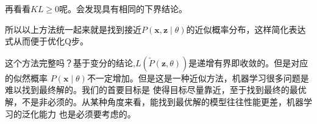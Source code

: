 \documentclass{article}
\begin{document}
        再看看$KL\ge0$呢。会发现具有相同的下界结论。

        所以以上方法统一起来就是找到接近$P(\boldsymbol{x},\boldsymbol{z}\mid\theta)$的近似概率分布，这样简化表达式从而便于优化Q步。

        这个方法完整吗？基于变分的结论,$L(\widetilde{P}(\boldsymbol{z},\theta))$是递增有界即收敛的。但是对应的似然概率
        $P(\boldsymbol{x}\mid\theta)$不一定增加。但是这是一种近似方法，机器学习很多问题是难以找到最终解的。我们的首要目标是
        使得目标尽量靠近，至于找到最终的最优解，不是非必须的。从某种角度来看，能找到最优解的模型往往性能更差，机器学习的泛化能力
        也是必须要考虑的。
\end{document}
